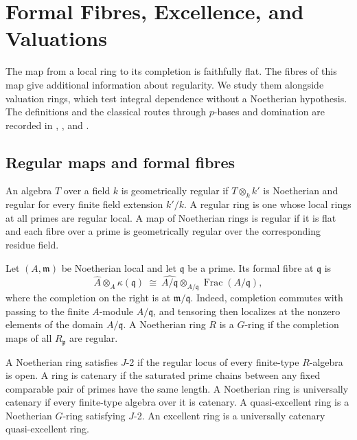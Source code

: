 \chapter[Excellence and Valuations]{Formal Fibres, Excellence, and Valuations}
\label{ch:excellence-valuations}

The map from a local ring to its completion is faithfully flat. The fibres of this map give additional information about regularity. We study them alongside valuation rings, which test integral dependence without a Noetherian hypothesis. The definitions and the classical routes through \(p\)-bases and domination are recorded in \cite[Sections 47--53 and 125]{st-more}, \cite[Section 50]{st-alg}, and \cite[Section 32]{matsumura}.

\section{Regular maps and formal fibres}

\begin{definition}\label{res:X01}
An algebra \(T\) over a field \(k\) is geometrically regular if \(T\otimes_k k'\) is Noetherian and regular for every finite field extension \(k'/k\). A regular ring is one whose local rings at all primes are regular local. A map of Noetherian rings is regular if it is flat and each fibre over a prime is geometrically regular over the corresponding residue field.

Let \((A,\mathfrak m)\) be Noetherian local and let \(\mathfrak q\) be a prime. Its formal fibre at \(\mathfrak q\) is
\[
 \widehat A\otimes_A\kappa(\mathfrak q)
  \ \cong\ \widehat{A/\mathfrak q}\otimes_{A/\mathfrak q}\operatorname{Frac}(A/\mathfrak q),
\]
where the completion on the right is at \(\mathfrak m/\mathfrak q\). Indeed, completion commutes with passing to the finite \(A\)-module \(A/\mathfrak q\), and tensoring then localizes at the nonzero elements of the domain \(A/\mathfrak q\). A Noetherian ring \(R\) is a \(G\)-ring if the completion maps of all \(R_{\mathfrak p}\) are regular.

A Noetherian ring satisfies \(J\)-2 if the regular locus of every finite-type \(R\)-algebra is open. A ring is catenary if the saturated prime chains between any fixed comparable pair of primes have the same length. A Noetherian ring is universally catenary if every finite-type algebra over it is catenary. A quasi-excellent ring is a Noetherian \(G\)-ring satisfying \(J\)-2. An excellent ring is a universally catenary quasi-excellent ring.
\end{definition}


